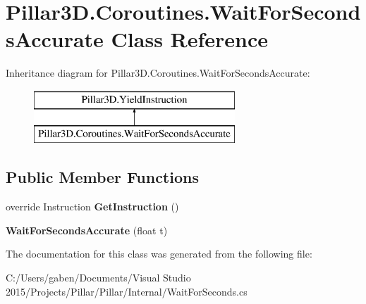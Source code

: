 \hypertarget{class_pillar3_d_1_1_coroutines_1_1_wait_for_seconds_accurate}{}\section{Pillar3\+D.\+Coroutines.\+Wait\+For\+Seconds\+Accurate Class Reference}
\label{class_pillar3_d_1_1_coroutines_1_1_wait_for_seconds_accurate}
Inheritance diagram for Pillar3\+D.\+Coroutines.\+Wait\+For\+Seconds\+Accurate\+:\begin{figure}[H]
\begin{center}
\leavevmode
\includegraphics[height=2.000000cm]{class_pillar3_d_1_1_coroutines_1_1_wait_for_seconds_accurate}
\end{center}
\end{figure}
\subsection*{Public Member Functions}
\begin{DoxyCompactItemize}
\item 
\mbox{\label{class_pillar3_d_1_1_coroutines_1_1_wait_for_seconds_accurate_a9167921ec6a1a719e5a437c64681bb0d}} 
override Instruction {\bfseries Get\+Instruction} ()
\item 
\mbox{\label{class_pillar3_d_1_1_coroutines_1_1_wait_for_seconds_accurate_a2cbefdf8b00e056b0822874d20fdccf0}} 
{\bfseries Wait\+For\+Seconds\+Accurate} (float t)
\end{DoxyCompactItemize}


The documentation for this class was generated from the following file\+:\begin{DoxyCompactItemize}
\item 
C\+:/\+Users/gaben/\+Documents/\+Visual Studio 2015/\+Projects/\+Pillar/\+Pillar/\+Internal/Wait\+For\+Seconds.\+cs\end{DoxyCompactItemize}
